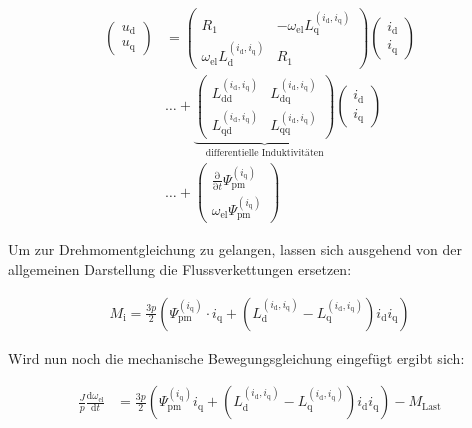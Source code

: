 \documentclass[conference,twocolumn]{IEEEtran}
\newcommand{\x}[1]{\mathrm{#1}}
\begin{document}
\begin{align}
\left( \begin{array}{c} u_\x{d} \\ u_\x{q} \end{array} \right) &= \left( \begin{array}{cc} R_\x{1} & -\omega_\x{el}L_\x{q}^{(i_\x{d},i_\x{q})} \\ \omega_\x{el}L_\x{d}^{(i_\x{d},i_\x{q})} & R_\x{1} \end{array} \right) \left(\begin{array}{c} i_\x{d} \\ i_\x{q} \end{array}\right) \label{eqn:allg-spannungsgleichung} \\ 
 &\ldots + \underbrace{\left( \begin{array}{cc} L_\x{dd}^{(i_\x{d},i_\x{q})} & L_\x{dq}^{(i_\x{d},i_\x{q})} \\ L_\x{qd}^{(i_\x{d},i_\x{q})} & L_\x{qq}^{(i_\x{d},i_\x{q})} \end{array}\right)}_{\text{differentielle Induktivitäten}} \left(\begin{array}{c} i_\x{d} \\ i_\x{q} \end{array} \right) \nonumber \\ 
& \ldots + \left( \begin{array}{c} \frac{\x{\partial}}{\x{\partial }t} \Psi_\x{pm}^{(i_\x{q})} \\ \omega_\x{el} \Psi_\x{pm}^{(i_\x{q})} \nonumber \end{array}  \right) \nonumber
\end{align}

Um zur Drehmomentgleichung zu gelangen, lassen sich ausgehend von der allgemeinen Darstellung die Flussverkettungen ersetzen:

\begin{align}
M_\x{i} = \frac{3p}{2}\left( \Psi_\x{pm}^{(i_\x{q})}\cdot i_\x{q} + (L_\x{d}^{(i_\x{d},i_\x{q})}-L_\x{q}^{(i_\x{d},i_\x{q})})i_\x{d} i_\x{q}\right)
\end{align}

Wird nun noch die mechanische Bewegungsgleichung eingefügt ergibt sich:

\begin{small}
\begin{align}
\frac{J}{p}\frac{\x{d}\omega_\x{el}}{\x{d}t} &= \frac{3p}{2}(\Psi^{(i_\x{q})}_\x{pm}i_\x{q} + (L^{(i_\x{d},i_\x{q})}_\x{d}-L^{(i_\x{d},i_\x{q})}_\x{q})i_\x{d} i_\x{q}) - M_\x{Last} \label{eqn:allg-drehmoment}
\end{align}
\end{small}
\end{document}
